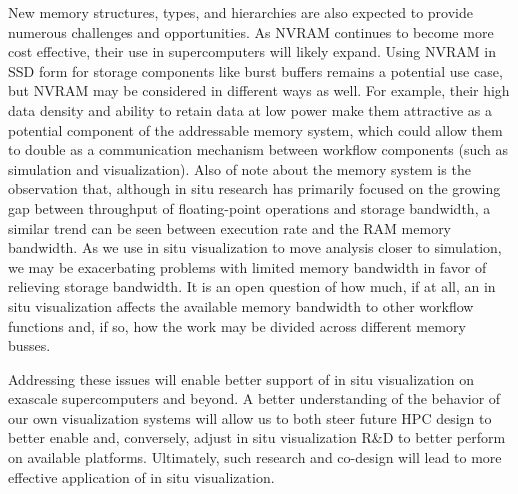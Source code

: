 \begin{refsection}
New memory structures, types, and hierarchies are also expected to provide numerous challenges and opportunities. As NVRAM continues to become more cost effective, their use in supercomputers will likely expand. Using NVRAM in SSD form for storage components like burst buffers remains a potential use case, but NVRAM may be considered in different ways as well. For example, their high data density and ability to retain data at low power make them attractive as a potential component of the addressable memory system, which could allow them to double as a communication mechanism between workflow components (such as simulation and visualization).
Also of note about the memory system is the observation that, although in situ research has primarily focused on the growing gap between throughput of floating-point operations and storage bandwidth, a similar trend can be seen between execution rate and the RAM memory bandwidth. As we use in situ visualization to move analysis closer to simulation, we may be exacerbating problems with limited memory bandwidth in favor of relieving storage bandwidth. It is an open question of how much, if at all, an in situ visualization affects the available memory bandwidth to other workflow functions and, if so, how the work may be divided across different memory busses.

Addressing these issues will enable better support of in situ visualization on exascale supercomputers and beyond. A better understanding of the behavior of our own visualization systems will allow us to both steer future HPC design to better enable and, conversely, adjust in situ visualization R\&D to better perform on available platforms. Ultimately, such research and co-design will lead to more effective application of in situ visualization.

\printbibliography
\end{refsection}

